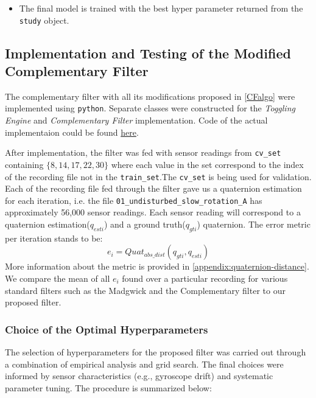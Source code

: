 \documentclass{iutbscthesis}
\begin{document}
\begin{itemize}
    
    \item The final model is trained with the best hyper parameter returned from the \texttt{study} object.

\end{itemize}
\subsection{Implementation and Testing of the Modified Complementary Filter} \label{section:impl-and-testing}
The complementary filter with all its modifications proposed in \autoref{CFalgo} were implemented using \texttt{python}. Separate classes were constructed for the \textit{Toggling Engine} and \textit{Complementary Filter} implementation. Code of the actual implementaion could be found \href{https://github.com/azfarus/NDAG_MARG_THESIS_v2}{here}\footnotemark{}.


\par
After implementation, the filter was fed with sensor readings from  \texttt{cv\_set}\label{cv_set} containing $\{8, 14, 17, 22, 30\}$ where each value in the set correspond to the index of the recording file not in the \texttt{train\_set}.The \texttt{cv\_set} is being used for validation. Each of the recording file fed through the filter gave us a quaternion estimation for each iteration, i.e. the file \texttt{01\_undisturbed\_slow\_rotation\_A} has approximately 56,000 sensor readings. Each sensor reading will correspond to a quaternion estimation($q_{esti}$) and a ground truth($q_{gti}$) quaternion. The error metric per iteration stands to be:
\begin{equation}
    e_i = Quat_{abs\_dist}(q_{gti},q_{esti})
\end{equation}
More information about the metric is provided in \autoref{appendix:quaternion-distance}. We compare the mean of all $e_i$ found over a particular recording for various standard filters such as the Madgwick and the Complementary filter to our proposed filter.

\subsubsection{Choice of the Optimal Hyperparameters}\label{subsubsec:hyperparams}

The selection of hyperparameters for the proposed filter was carried out through a combination of empirical analysis and grid search. The final choices were informed by sensor characteristics (e.g., gyroscope drift) and systematic parameter tuning. The procedure is summarized below:
\end{document}
